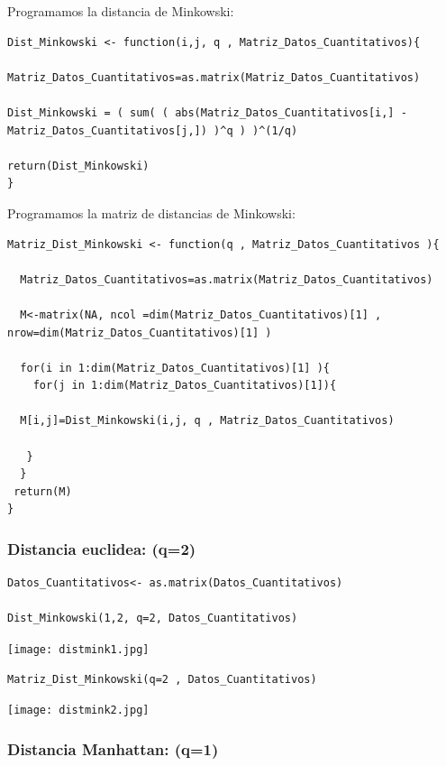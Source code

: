 \documentclass[12pt]{report} %
\begin{document}
Programamos la  distancia  de Minkowski:

\begin{lstlisting}
Dist_Minkowski <- function(i,j, q , Matriz_Datos_Cuantitativos){
  
Matriz_Datos_Cuantitativos=as.matrix(Matriz_Datos_Cuantitativos)  

Dist_Minkowski = ( sum( ( abs(Matriz_Datos_Cuantitativos[i,] - Matriz_Datos_Cuantitativos[j,]) )^q ) )^(1/q)
  
return(Dist_Minkowski)
}
\end{lstlisting}


Programamos la matriz de distancias de Minkowski:

\begin{lstlisting}
Matriz_Dist_Minkowski <- function(q , Matriz_Datos_Cuantitativos ){
  
  Matriz_Datos_Cuantitativos=as.matrix(Matriz_Datos_Cuantitativos)
  
  M<-matrix(NA, ncol =dim(Matriz_Datos_Cuantitativos)[1] , nrow=dim(Matriz_Datos_Cuantitativos)[1] )
  
  for(i in 1:dim(Matriz_Datos_Cuantitativos)[1] ){
    for(j in 1:dim(Matriz_Datos_Cuantitativos)[1]){
    
  M[i,j]=Dist_Minkowski(i,j, q , Matriz_Datos_Cuantitativos)
  
   }
  }
 return(M)
}
\end{lstlisting}

\newpage

\subsubsection{Distancia euclidea: (q=2)}


\begin{lstlisting}
Datos_Cuantitativos<- as.matrix(Datos_Cuantitativos)

Dist_Minkowski(1,2, q=2, Datos_Cuantitativos)
\end{lstlisting}

\texttt{[image: distmink1.jpg]}


\begin{lstlisting}
Matriz_Dist_Minkowski(q=2 , Datos_Cuantitativos) 
\end{lstlisting}

\texttt{[image: distmink2.jpg]}

\newpage


\subsubsection{Distancia Manhattan: (q=1)}
\end{document}
